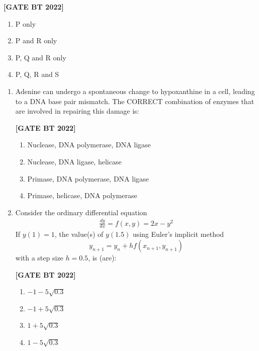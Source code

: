 \documentclass[12pt]{article}
\begin{document}
\begin{enumerate}[leftmargin=2.5em, label=\textbf{Q.\arabic*}., itemsep=2em, resume]
\noindent \textbf{[GATE BT 2022]}
\begin{multicols}{2}
\begin{enumerate}
    \item P only
    \item P and R only
    \item P, Q and R only
    \item P, Q, R and S
\end{enumerate}
\end{multicols}

\end{enumerate}

\begin{enumerate}[leftmargin=2.5em, label=\textbf{Q.\arabic*}., itemsep=2em, resume]

\item Adenine can undergo a spontaneous change to hypoxanthine in a cell, leading to a DNA base pair mismatch.  
The CORRECT combination of enzymes that are involved in repairing this damage is:

\noindent \textbf{[GATE BT 2022]}

\begin{multicols}{2}
\begin{enumerate}
    \item Nuclease, DNA polymerase, DNA ligase
    \item Nuclease, DNA ligase, helicase
    \item Primase, DNA polymerase, DNA ligase
    \item Primase, helicase, DNA polymerase
\end{enumerate}
\end{multicols}

\item Consider the ordinary differential equation
\begin{align*}
\frac{dy}{dx} = f(x,y) = 2x - y^2
\end{align*}
If $y(1) = 1$, the value(s) of $y(1.5)$ using Euler’s implicit method
\[
y_{n+1} = y_n + h f(x_{n+1}, y_{n+1})
\]
with a step size $h=0.5$, is (are):

\noindent \textbf{[GATE BT 2022]}

\begin{multicols}{2}
\begin{enumerate}
    \item $-1 - 5\sqrt{0.3}$
    \item $-1 + 5\sqrt{0.3}$
    \item $1 + 5\sqrt{0.3}$
    \item $1 - 5\sqrt{0.3}$
\end{enumerate}
\end{multicols}


\end{enumerate}
\end{document}
